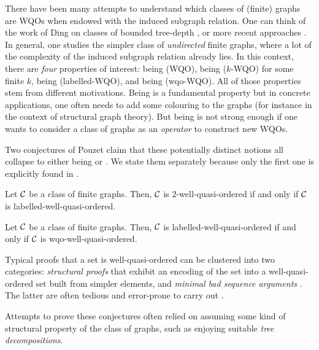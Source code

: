 There have been many attempts to understand which classes of (finite) graphs
are WQOs when endowed with the induced subgraph relation. One can think of the
work of Ding on classes of bounded tree-depth \cite{DING92}, or more recent
approaches \cite{DLP17,POZA22}. In general, one studies the simpler class of
\emph{undirected} finite graphs, where a lot of the complexity of the induced
subgraph relation already lies. In this context, there are \emph{four}
properties of interest: being  (WQO), being
 ($k$-WQO) for some finite $k$, being
 (labelled-WQO), and being
 (wqo-WQO). All of those properties stem from
different motivations. Being  is a fundamental property but in concrete
applications, one often needs to add some colouring to the graphs (for instance
in the context of structural graph theory). But being  is not
strong enough if one wants to consider a class of graphs as an \emph{operator}
to construct new WQOs.

Two conjectures of Pouzet claim that these potentially distinct notions all
collapse to either being  or . We state them separately
because only the first one is explicitly found in \cite{POUZ72}.

\begin{conjecture}
    \label{pouzet1:conj}
    Let $\mathcal{C}$ be a class of finite graphs.
    Then, $\mathcal{C}$ is 2-well-quasi-ordered
    if and only if
    $\mathcal{C}$ is labelled-well-quasi-ordered.
\end{conjecture}

\begin{conjecture}
    \label{pouzet2:conj}
    Let $\mathcal{C}$ be a class of finite graphs.
    Then, $\mathcal{C}$ is labelled-well-quasi-ordered
    if and only if
    $\mathcal{C}$ is wqo-well-quasi-ordered.
\end{conjecture}

Typical proofs that a set is well-quasi-ordered can be clustered into two
categories: \emph{structural proofs} that exhibit an encoding of the set into a
well-quasi-ordered set built from simpler elements, and \emph{minimal bad
sequence arguments} \cite{NASH65}. The latter are often tedious and error-prone
to carry out \cite[Discussion xxx]{LOPEZ23}. 

Attempts to prove these conjectures often relied on assuming some kind of
structural property of the class of graphs, such as enjoying suitable
\emph{tree decompositions}.

